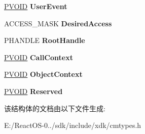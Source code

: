 \begin{DoxyCompactItemize}
\hyperlink{interfacevoid}{P\+V\+O\+ID} {\bfseries User\+Event}
\item 
\mbox{\label{struct___r_e_g___l_o_a_d___k_e_y___i_n_f_o_r_m_a_t_i_o_n_a37d2ab9527bc1e898140978f90984f0d}} 
A\+C\+C\+E\+S\+S\+\_\+\+M\+A\+SK {\bfseries Desired\+Access}
\item 
\mbox{\label{struct___r_e_g___l_o_a_d___k_e_y___i_n_f_o_r_m_a_t_i_o_n_a824fdcec0c38a8a537b9e957b22c0290}} 
P\+H\+A\+N\+D\+LE {\bfseries Root\+Handle}
\item 
\mbox{\label{struct___r_e_g___l_o_a_d___k_e_y___i_n_f_o_r_m_a_t_i_o_n_a63c41d742adea199dedebc18ba1f3463}} 
\hyperlink{interfacevoid}{P\+V\+O\+ID} {\bfseries Call\+Context}
\item 
\mbox{\label{struct___r_e_g___l_o_a_d___k_e_y___i_n_f_o_r_m_a_t_i_o_n_a3f74811a1cb31b269005f01260b8fa98}} 
\hyperlink{interfacevoid}{P\+V\+O\+ID} {\bfseries Object\+Context}
\item 
\mbox{\label{struct___r_e_g___l_o_a_d___k_e_y___i_n_f_o_r_m_a_t_i_o_n_a9541e4cb541621a6c4bbb364f642c38e}} 
\hyperlink{interfacevoid}{P\+V\+O\+ID} {\bfseries Reserved}
\end{DoxyCompactItemize}


该结构体的文档由以下文件生成\+:\begin{DoxyCompactItemize}
\item 
E\+:/\+React\+O\+S-\/0../sdk/include/xdk/cmtypes.\+h\end{DoxyCompactItemize}
